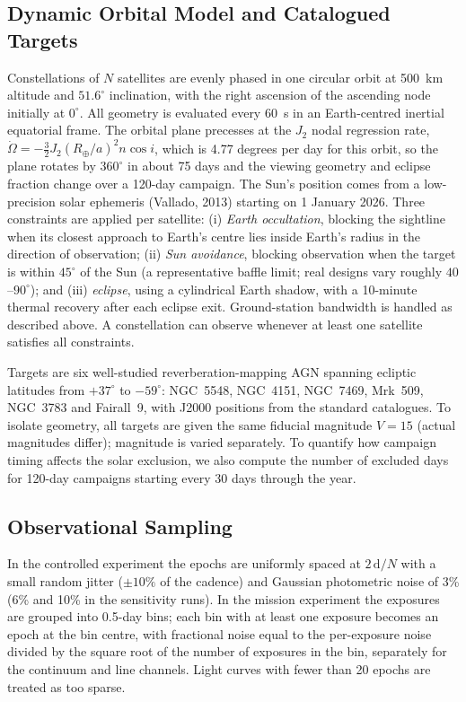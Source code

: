 \documentclass[11pt]{article}
\begin{document}
\subsection{Dynamic Orbital Model and Catalogued Targets}
\label{sec:orbit}

Constellations of $N$ satellites are evenly phased in one circular orbit at 500~km altitude and $51.6^{\circ}$ inclination, with the right ascension of the ascending node initially at $0^{\circ}$. All geometry is evaluated every 60~s in an Earth-centred inertial equatorial frame. The orbital plane precesses at the $J_2$ nodal regression rate, $\dot\Omega = -\tfrac{3}{2} J_2 (R_\oplus/a)^2 n \cos i$, which is 4.77 degrees per day for this orbit, so the plane rotates by $360^{\circ}$ in about 75 days and the viewing geometry and eclipse fraction change over a 120-day campaign. The Sun's position comes from a low-precision solar ephemeris (Vallado, 2013) starting on 1 January 2026. Three constraints are applied per satellite: (i) \emph{Earth occultation}, blocking the sightline when its closest approach to Earth's centre lies inside Earth's radius in the direction of observation; (ii) \emph{Sun avoidance}, blocking observation when the target is within $45^{\circ}$ of the Sun (a representative baffle limit; real designs vary roughly $40$--$90^{\circ}$); and (iii) \emph{eclipse}, using a cylindrical Earth shadow, with a 10-minute thermal recovery after each eclipse exit. Ground-station bandwidth is handled as described above. A constellation can observe whenever at least one satellite satisfies all constraints.

Targets are six well-studied reverberation-mapping AGN spanning ecliptic latitudes from $+37^{\circ}$ to $-59^{\circ}$: NGC~5548, NGC~4151, NGC~7469, Mrk~509, NGC~3783 and Fairall~9, with J2000 positions from the standard catalogues.
To isolate geometry, all targets are given the same fiducial magnitude $V = 15$ (actual magnitudes differ); magnitude is varied separately. To quantify how campaign timing affects the solar exclusion, we also compute the number of excluded days for 120-day campaigns starting every 30 days through the year.

\subsection{Observational Sampling}

In the controlled experiment the epochs are uniformly spaced at $2\,\mathrm{d}/N$ with a small random jitter ($\pm10\%$ of the cadence) and Gaussian photometric noise of 3\% (6\% and 10\% in the sensitivity runs). In the mission experiment the exposures are grouped into 0.5-day bins; each bin with at least one exposure becomes an epoch at the bin centre, with fractional noise equal to the per-exposure noise divided by the square root of the number of exposures in the bin, separately for the continuum and line channels. Light curves with fewer than 20 epochs are treated as too sparse.
\end{document}
